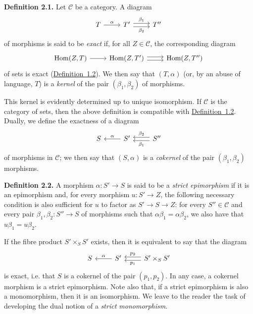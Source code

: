 \documentclass{article}
\newenvironment{rmenv}[1]
  {\phantomsection\par\medskip\noindent\textbf{#1.}\rmfamily}
  {\par\medskip}
\renewcommand{\cal}[1]{{\mathcal{#1}}}
\DeclareMathOperator{\Hom}{Hom}
\newcommand{\oldpage}[1]{\marginpar{\footnotesize$\Big\vert$ \textit{p.~#1}}}
\begin{document}
\subsection{}
\label{A.2.a}

\begin{rmenv}{Definition 2.1}
\label{definition:A.2.1}
  Let $\cal{C}$ be a category.
  A diagram
  \[
    \begin{tikzcd}
      T \rar["\alpha"]
      & T' \rar[shift left=1,"\beta_1"] \rar[shift right=1,swap,"\beta_2"]
      & T''
    \end{tikzcd}
  \]
  of morphisms is said to be \emph{exact} if, for all $Z\in\cal{C}$, the corresponding diagram
  \[
    \begin{tikzcd}
      \Hom(Z,T) \rar
      & \Hom(Z,T') \rar[shift left=1] \rar[shift right=1]
      & \Hom(Z,T'')
    \end{tikzcd}
  \]
  of sets is exact (\hyperref[definition:A.1.2]{Definition~1.2}).
  We then say that $(T,\alpha)$ (or, by an abuse of language, $T$) is a \emph{kernel} of the pair $(\beta_1,\beta_2)$ of morphisms.
\end{rmenv}

This kernel is evidently determined up to unique isomorphism.
If $\cal{C}$ is the category of sets, then the above definition is compatible with \hyperref[definition:A.1.2]{Definition~1.2}.
Dually, we define the exactness of a diagram
\[
  \begin{tikzcd}
    S
    & S' \lar[swap,"\alpha"]
    & S''\lar[shift left=1,"\beta_1"] \lar[shift right=1,swap,"\beta_2"]
  \end{tikzcd}
\]
of morphisms in $\cal{C}$;
we then say that $(S,\alpha)$ is a \emph{cokernel} of the pair $(\beta_1,\beta_2)$ morphisms.

\begin{rmenv}{Definition 2.2}
\label{definition:A.2.2}
  A morphism $\alpha\colon S'\to S$ is said to be a \emph{strict epimorphism} if it is an epimorphism and, for every morphism $u\colon S'\to Z$, the following necessary condition is also sufficient for $u$ to factor as $S'\to S\to Z$:
  for every $S''\in\cal{C}$ and every pair $\beta_1,\beta_2\colon S''\to S$ of morphisms such that $\alpha\beta_1=\alpha\beta_2$, we also have that $u\beta_1=u\beta_2$.
\end{rmenv}

If the fibre product $S'\times_S S'$ exists, then it is equivalent to say that the diagram
\[
  \begin{tikzcd}
    S
    & S' \lar[swap,"\alpha"]
    & S'\times_S S'\lar[shift left=1,"p_1"] \lar[shift right=1,swap,"p_2"]
  \end{tikzcd}
\]
\oldpage{190-07}
is exact, i.e. that $S$ is a cokernel of the pair $(p_1,p_2)$.
In any case, a cokernel morphism is a strict epimorphism.
Note also that, if a strict epimorphism is also a monomorphism, then it is an isomorphism.
We leave to the reader the task of developing the dual notion of a \emph{strict monomorphism}.
\end{document}
